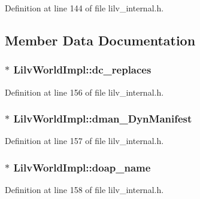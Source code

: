 Definition at line 144 of file lilv\+\_\+internal.\+h.



\subsection{Member Data Documentation}
\subsubsection[{\texorpdfstring{dc\+\_\+replaces}{dc_replaces}}]{$\ast$ Lilv\+World\+Impl\+::dc\+\_\+replaces}\hypertarget{struct_lilv_world_impl_add5290ce314ab20c9f370d2253fc3100}{}\label{struct_lilv_world_impl_add5290ce314ab20c9f370d2253fc3100}


Definition at line 156 of file lilv\+\_\+internal.\+h.

\subsubsection[{\texorpdfstring{dman\+\_\+\+Dyn\+Manifest}{dman_DynManifest}}]{$\ast$ Lilv\+World\+Impl\+::dman\+\_\+\+Dyn\+Manifest}\hypertarget{struct_lilv_world_impl_a54934efe230a5bfb796e588ecbc98a98}{}\label{struct_lilv_world_impl_a54934efe230a5bfb796e588ecbc98a98}


Definition at line 157 of file lilv\+\_\+internal.\+h.

\subsubsection[{\texorpdfstring{doap\+\_\+name}{doap_name}}]{$\ast$ Lilv\+World\+Impl\+::doap\+\_\+name}\hypertarget{struct_lilv_world_impl_a47cd10b3dd35618609b681afb0b22c43}{}\label{struct_lilv_world_impl_a47cd10b3dd35618609b681afb0b22c43}


Definition at line 158 of file lilv\+\_\+internal.\+h.

